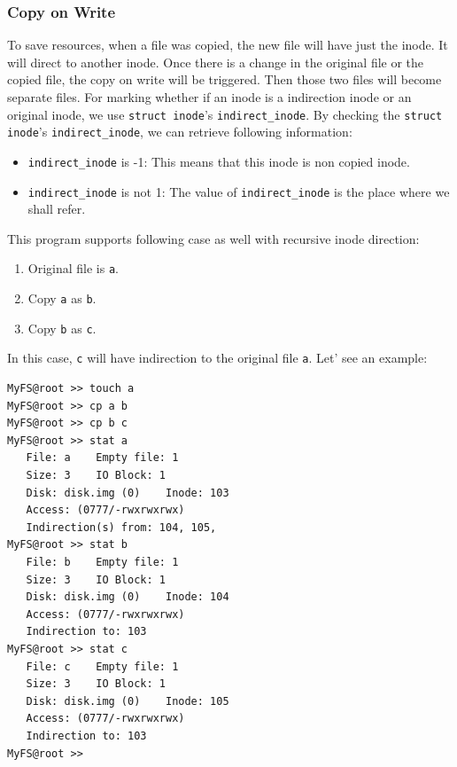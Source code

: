 \documentclass{homework}
\begin{document}
\subsubsection{Copy on Write}
To save resources, when a file was copied, the new file will have just the inode. It will direct to another inode. Once there is a change in the original file or the copied file, the copy on write will be triggered. Then those two files will become separate files. For marking whether if an inode is a indirection inode or an original inode, we use \texttt{struct inode}'s \texttt{indirect_inode}. By checking the \texttt{struct inode}'s \texttt{indirect_inode}, we can retrieve following information:
\begin{itemize}
    \item \texttt{indirect_inode} is -1: This means that this inode is non copied inode. 
    \item \texttt{indirect_inode} is not 1: The value of \texttt{indirect_inode} is the place where we shall refer.
\end{itemize}

This program supports following case as well with recursive inode direction:
\begin{enumerate}
    \item Original file is \texttt{a}.
    \item Copy \texttt{a} as \texttt{b}.
    \item Copy \texttt{b} as \texttt{c}.
\end{enumerate}
In this case, \texttt{c} will have indirection to the original file \texttt{a}. Let' see an example:
\\
\begin{center}
\begin{code}
\begin{verbatim}
MyFS@root >> touch a
MyFS@root >> cp a b
MyFS@root >> cp b c
MyFS@root >> stat a
   File: a    Empty file: 1
   Size: 3    IO Block: 1
   Disk: disk.img (0)    Inode: 103
   Access: (0777/-rwxrwxrwx)
   Indirection(s) from: 104, 105,
MyFS@root >> stat b
   File: b    Empty file: 1
   Size: 3    IO Block: 1
   Disk: disk.img (0)    Inode: 104
   Access: (0777/-rwxrwxrwx)
   Indirection to: 103
MyFS@root >> stat c
   File: c    Empty file: 1
   Size: 3    IO Block: 1
   Disk: disk.img (0)    Inode: 105
   Access: (0777/-rwxrwxrwx)
   Indirection to: 103
MyFS@root >>
\end{verbatim}
\end{code}
\end{center}
\end{document}
